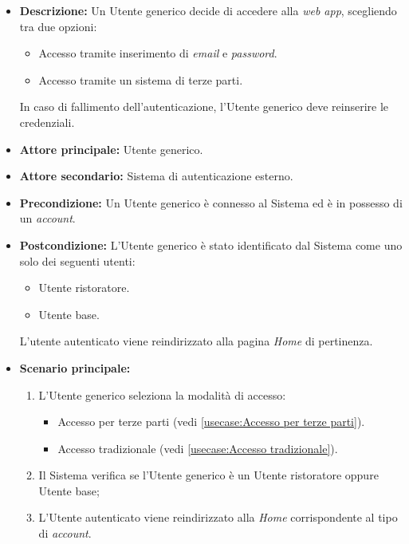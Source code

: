 \label{usecase:Effettua accesso}

\begin{itemize}
	\item \textbf{Descrizione:} Un Utente generico decide di accedere alla \textit{web app}, scegliendo tra due opzioni:
	\begin{itemize}
		\item Accesso tramite inserimento di \textit{email} e \textit{password}.
		\item Accesso tramite un sistema di terze parti.
	\end{itemize}
	In caso di fallimento dell'autenticazione, l'Utente generico deve reinserire le credenziali.

	\item \textbf{Attore principale:} Utente generico.
	\item \textbf{Attore secondario:} Sistema di autenticazione esterno.
	\item \textbf{Precondizione:}
	      Un Utente generico è connesso al Sistema ed è in possesso di un \textit{account}.
	\item \textbf{Postcondizione:}
	      L'Utente generico è stato identificato dal Sistema come uno solo dei seguenti utenti:
	      \begin{itemize}
		      \item Utente ristoratore.
		      \item Utente base.
	      \end{itemize}
		  L'utente autenticato viene reindirizzato alla pagina \textit{Home} di pertinenza.

	\item \textbf{Scenario principale:}
	      \begin{enumerate}
		      \item L'Utente generico seleziona la modalità di accesso: 

			  \begin{itemize}
				\item Accesso per terze parti (vedi \autoref{usecase:Accesso per terze parti}).
				\item Accesso tradizionale (vedi \autoref{usecase:Accesso tradizionale}).
			  \end{itemize}

		      \item Il Sistema verifica se l'Utente generico è un Utente ristoratore oppure Utente base;
		      \item L'Utente autenticato viene reindirizzato alla \textit{Home} corrispondente al tipo di \textit{account}.		
	      \end{enumerate}
		

\end{itemize}
